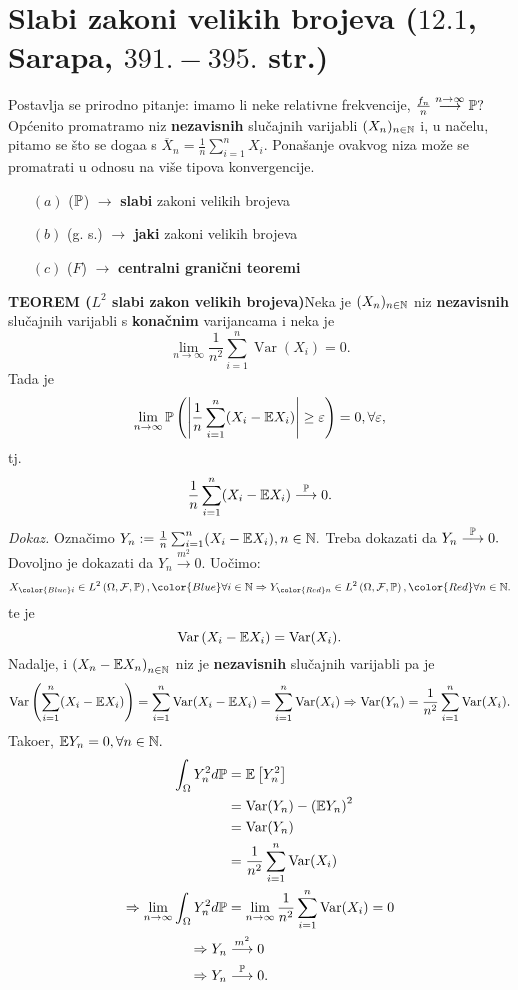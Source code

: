 \documentclass{article}
\newcommand{\Var}{\operatorname{Var}}
\begin{document}
\section{Slabi zakoni velikih brojeva (\textsection \(12.1\), Sarapa, \(391.-395.\) str.)}
Postavlja se prirodno pitanje: imamo li neke relativne frekvencije, \(\frac{f_n}n\overset{n\to\infty}{\longrightarrow}\Bbb P?\)\newline\newline Općenito promatramo niz \textbf{nezavisnih} slučajnih varijabli \((X_n)_{n\in\Bbb N}\) i, u načelu, pitamo se što se doga\dj{}a s \(\overline X_n=\frac1n\sum_{i=1}^nX_i.\) Ponašanje ovakvog niza može se promatrati u odnosu na više tipova konvergencije.
\begin{itemize}
    \item[\((a)\)] (\(\Bbb P\)) \(\rightarrow\) \textbf{slabi} zakoni velikih brojeva
    \item[\((b)\)] (g. s.) \(\rightarrow\) \textbf{jaki} zakoni velikih brojeva
    \item[\((c)\)] (\(F\)) \(\rightarrow\) \textbf{centralni granični teoremi}
\end{itemize}
\textbf{TEOREM (\(L^2\) slabi zakon velikih brojeva)}\newline Neka je \((X_n)_{n\in\Bbb N}\) niz \textbf{nezavisnih} slučajnih varijabli s \textbf{konačnim} varijancama i neka je \[\lim_{n\to\infty}\frac1{n^2}\sum_{i=1}^n\Var (X_i)=0.\] Tada je \[\lim_{n\to\infty}\Bbb P\left(\left|\frac1n\sum_{i=1}^n(X_i-\Bbb EX_i)\right|\ge\varepsilon\right)=0,\forall\varepsilon,\] tj. \[\frac1n\sum_{i=1}^n(X_i-\Bbb EX_i)\overset{\Bbb P}{\longrightarrow}0.\] 
\textit{Dokaz.}\newline 
Označimo \(Y_n:=\frac1n\sum_{i=1}^n(X_i-\Bbb EX_i),n\in\Bbb N.\) Treba dokazati da \(Y_n\overset{\Bbb P}{\longrightarrow}0.\) Dovoljno je dokazati da \(Y_n\overset{m^2}{\longrightarrow}0.\) Uočimo: \[X_{\color{Blue}i}\in L^2\left(\Omega,\mathcal F,\Bbb P\right),{\color{Blue}\forall i}\in\Bbb N\Rightarrow Y_{\color{Red}n}\in L^2\left(\Omega,\mathcal F,\Bbb P\right),{\color{Red}\forall n}\in\Bbb N.\] te je \[\Var \left(X_i-\Bbb EX_i\right)=\Var (X_i).\] Nadalje, i \(\left(X_n-\Bbb EX_n\right)_{n\in\Bbb N}\) niz je \textbf{nezavisnih} slučajnih varijabli pa je \[\Var \left(\sum_{i=1}^n(X_i-\Bbb EX_i)\right)=\sum_{i=1}^n\Var (X_i-\Bbb EX_i)=\sum_{i=1}^n\Var (X_i)\Rightarrow\Var(Y_n)=\frac1{n^2}\sum_{i=1}^n\Var(X_i).\] Tako\dj{}er, \(\Bbb EY_n=0,\forall n\in\Bbb N.\) \[\begin{aligned}\int_\Omega Y_n^2d\Bbb P&=\Bbb E\left[Y_n^2\right]\\&=\Var (Y_n)-\left(\Bbb EY_n\right)^2\\&=\Var (Y_n)\\&=\frac1{n^2}\sum_{i=1}^n\Var (X_i)\\\Rightarrow\lim_{n\to\infty}\int_\Omega Y_n^2d\Bbb P&=\lim_{n\to\infty}\frac1{n^2}\sum_{i=1}^n\Var (X_i)=0\\\Rightarrow Y_n&\overset{m^2}{\longrightarrow}0\\\Rightarrow Y_n&\overset{\Bbb P}{\longrightarrow}0.\end{aligned}\]
\end{document}
